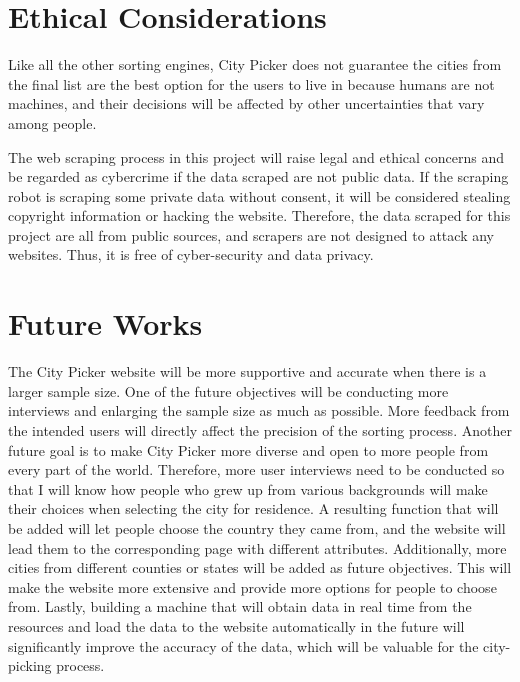 \documentclass[10pt,twocolumn]{article}
\begin{document}
\section{Ethical Considerations}
Like all the other sorting engines, City Picker does not guarantee the cities from the final list are the best option for the users to live in because humans are not machines, and their decisions will be affected by other uncertainties that vary among people.

The web scraping process in this project will raise legal and ethical concerns and be regarded as cybercrime if the data scraped are not public data\cite{Day2022}. If the scraping robot is scraping some private data without consent, it will be considered stealing copyright information or hacking the website. Therefore, the data scraped for this project are all from public sources, and scrapers are not designed to attack any websites. Thus, it is free of cyber-security and data privacy.

\section{Future Works}
The City Picker website will be more supportive and accurate when there is a larger sample size. One of the future objectives will be conducting more interviews and enlarging the sample size as much as possible. More feedback from the intended users will directly affect the precision of the sorting process. 
\newline
\indent
Another future goal is to make City Picker more diverse and open to more people from every part of the world. Therefore, more user interviews need to be conducted so that I will know how people who grew up from various backgrounds will make their choices when selecting the city for residence. A resulting function that will be added will let people choose the country they came from, and the website will lead them to the corresponding page with different attributes.
\newline
\indent
Additionally, more cities from different counties or states will be added as future objectives. This will make the website more extensive and provide more options for people to choose from. \newline
\indent
Lastly, building a machine that will obtain data in real time from the resources and load the data to the website automatically in the future will significantly improve the accuracy of the data, which will be valuable for the city-picking process.
\end{document}
